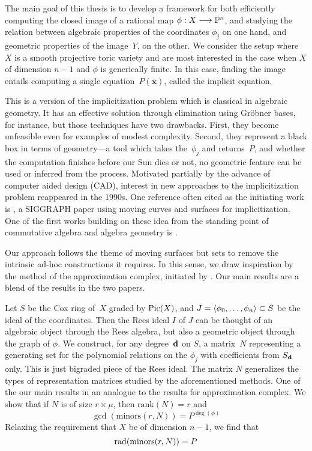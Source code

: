 \documentclass[fleqn,reqno]{amsart}
\begin{document}

The main goal of this thesis is to develop a framework for both
efficiently computing the closed image of a rational map $\phi:X\longrightarrow\mathbb{P}^n$, and
studying the relation between algebraic properties of the coordinates $\phi_j$ on one hand,
and geometric properties of the image~$Y$, on the other.
We consider the setup where $X$ is a smooth projective toric variety
and are most interested in the case when $X$ of dimension $n-1$ and $\phi$ is generically finite.
In this case,
finding the image entails computing a single equation~$P(\mathbf x)$,
called the implicit equation.

This is a version of the implicitization problem which is classical in algebraic geometry.
It has an effective solution through elimination using Gr\"obner bases, for instance,
but those techniques have two drawbacks.
First, they become unfeasible even for examples of modest complexity.
Second, they represent a black box in terms of geometry---a tool which
takes the~$\phi_j$ and returns~$P$,
and whether the computation finishes before our Sun dies or not,
no geometric feature can be used or inferred from the process.
Motivated partially by the advance of computer aided design (CAD),
interest in new approaches to the implicitization problem
reappeared in the 1990s.
One reference often cited as the initiating work is \cite{SC-95},
a SIGGRAPH paper using moving curves and surfaces for implicitization.
One of the first works building on these idea from the standing point
of commutative algebra and algebra geometry is \citet{CGZ-00}.

Our approach follows the theme of moving surfaces but sets to remove the intrinsic
ad-hoc constructions it requires.
In this sense,
we draw inspiration by the method of the approximation complex, initiated by \citet{BJ-03}.
Our main results are a blend of the results in the two papers.

Let $S$ be the Cox ring of~$X$ graded by $\operatorname{Pic}(X)$,
and $J=\langle\phi_0,\ldots,\phi_n\rangle\subset S$ be the ideal of the coordinates.
Then the Rees ideal $I$ of $J$ can be thought of
an algebraic object through the Rees algebra, but also
a geometric object through the graph of $\phi$.
We construct, for any degree~$\mathbf d$ on $S$,
a matrix~$N$ representing a generating set for the polynomial relations on the $\phi_j$
with coefficients from $S_\mathbf d$ only.
This is just bigraded piece of the Rees ideal.
The matrix $N$ generalizes the types of representation matrices
studied by the aforementioned methods.
One of the our main results in an analogue to the results for approximation complex.
We show that if $N$ is of size $r\times\mu$, then $\text{rank}(N)=r$ and
\[
	\gcd(\text{minors}(r,N))=P^{\deg(\phi)}
\]
Relaxing the requirement that $X$ be of dimension $n-1$, we find that
\[
	\operatorname{rad}(\text{minors}(r,N))=P
\]
\end{document}
